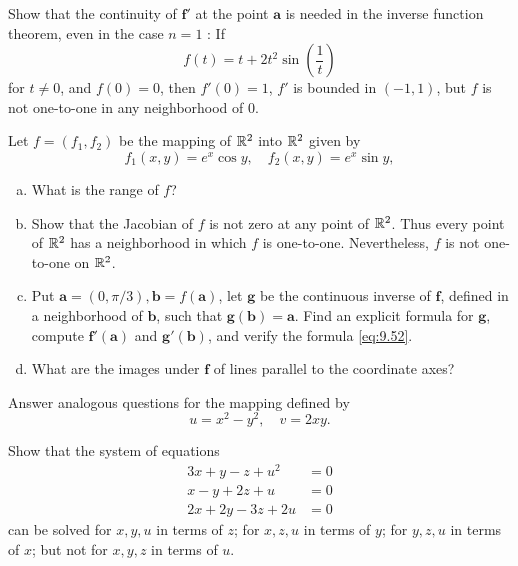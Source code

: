 \begin{myexercise}
    \label{ex:9.16}
    Show that the continuity of $\mathbf{f}'$ at the point $\mathbf{a}$ is needed in the inverse function theorem, even in the case $n = 1$ : If
    \begin{equation*}
        f(t) = t+2t^2\sin \left( \frac{1}{t} \right)
    \end{equation*} 
    for $t \neq 0$, and $f(0) = 0$, then $f'(0) = 1$, $f'$ is bounded in $(-1, 1)$, 
    but $f$ is not one-to-one in any neighborhood of 0.
\end{myexercise}


\begin{myexercise}
    \label{ex:9.17}
    Let $f = (f_1,f_2)$ be the mapping of ${\protect\mathbb R}^2$ into ${\protect\mathbb R}^2$ given by
    \begin{equation*}
        f_1(x,y) = e^x \cos y, 
        \quad
        f_2(x,y) = e^x \sin y, 
    \end{equation*}
    \begin{enumerate}[(a)]
        \item What is the range of $f$?
        \item Show that the Jacobian of $f$ is not zero at any point of ${\protect\mathbb R}^2$. 
        Thus every point of ${\protect\mathbb R}^2$ has a neighborhood in which $f$ is one-to-one. 
        Nevertheless, $f$ is not one-to-one on ${\protect\mathbb R}^2$.
        \item Put $\mathbf{a} = (0, \pi/3), \mathbf{b} = f(\mathbf{a})$, let $\mathbf{g}$ be the continuous inverse of $\mathbf{f}$, 
        defined in a neighborhood of $\mathbf{b}$, such that $\mathbf{g(b) = a}$. 
        Find an explicit formula for $\mathbf{g}$, compute $\mathbf{f'(a)}$ and $\mathbf{g'(b)}$, and verify the formula \eqref{eq:9.52}. 
        \item What are the images under $\mathbf{f}$ of lines parallel to the coordinate axes?
    \end{enumerate}
\end{myexercise}


\begin{myexercise}
    \label{ex:9.18}
    Answer analogous questions for the mapping defined by
    \begin{equation*}
        u = x^2-y^2, 
        \quad 
        v = 2xy.
    \end{equation*}
\end{myexercise}


\begin{myexercise}
    \label{ex:9.19}
    Show that the system of equations 
    \begin{align*}
        3x +  y -  z +  u^2 &= 0 \\
         x -  y + 2z +  u   &= 0 \\
        2x + 2y - 3z + 2u   &= 0 
    \end{align*}
    can be solved 
            for $x, y, u$ in terms of $z$;
            for $x, z, u$ in terms of $y$;
            for $y, z, u$ in terms of $x$;
    but not for $x, y, z$ in terms of $u$.
\end{myexercise}

